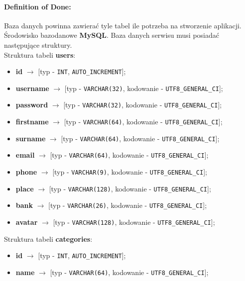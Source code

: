\documentclass[a4paper]{article}
\begin{document}
	\paragraph{Definition of Done:} Baza danych powinna zawierać tyle tabel ile potrzeba na stworzenie aplikacji. Środowisko bazodanowe \textbf{MySQL}. Baza danych serwisu musi posiadać następujące struktury.
	\vspace{0.5cm}
	\\Struktura tabeli \textbf{users}:
	\begin{itemize}
		\item \textbf{id} $\to$ [typ - \verb|INT|, \verb|AUTO_INCREMENT|];
		\item \textbf{username} $\to$ [typ - \verb|VARCHAR(32)|, kodowanie - \verb|UTF8_GENERAL_CI|];
		\item \textbf{password} $\to$ [typ - \verb|VARCHAR(32)|, kodowanie - \verb|UTF8_GENERAL_CI|];
		\item \textbf{firstname} $\to$ [typ - \verb|VARCHAR(64)|, kodowanie - \verb|UTF8_GENERAL_CI|];
		\item \textbf{surname} $\to$ [typ - \verb|VARCHAR(64)|, kodowanie - \verb|UTF8_GENERAL_CI|];
		\item \textbf{email} $\to$ [typ - \verb|VARCHAR(64)|, kodowanie - \verb|UTF8_GENERAL_CI|];
		\item \textbf{phone} $\to$ [typ - \verb|VARCHAR(9)|, kodowanie - \verb|UTF8_GENERAL_CI|];
		\item \textbf{place} $\to$ [typ - \verb|VARCHAR(128)|, kodowanie - \verb|UTF8_GENERAL_CI|];
		\item \textbf{bank} $\to$ [typ - \verb|VARCHAR(26)|, kodowanie - \verb|UTF8_GENERAL_CI|];
		\item \textbf{avatar} $\to$ [typ - \verb|VARCHAR(128)|, kodowanie - \verb|UTF8_GENERAL_CI|];
	\end{itemize}

	\vspace{0.5cm}
	Struktura tabeli \textbf{categories}:
	\begin{itemize}
		\item \textbf{id} $\to$ [typ - \verb|INT|, \verb|AUTO_INCREMENT|];
		\item \textbf{name} $\to$ [typ - \verb|VARCHAR(64)|, kodowanie - \verb|UTF8_GENERAL_CI|];
	\end{itemize}
\end{document}
